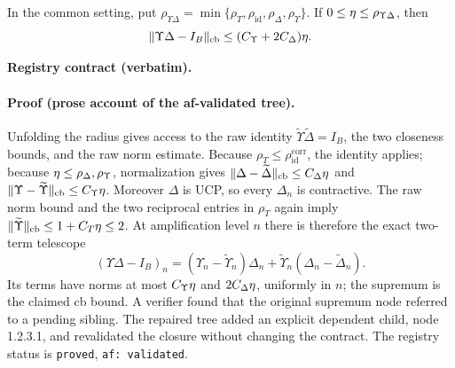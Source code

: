\begin{lemma}\label{lem:routef-upsilon-delta-telescope}
In the common setting, put
$\rho_{\Upsilon\Delta}=\min\{\rho_T,\rho_{\mathrm{id}},\rho_{\Delta},\rho_{\Upsilon}\}$.
If $0\le\eta\le\rho_{\Upsilon\Delta}$, then
\[
 \lVert \Upsilon\Delta-I_B\rVert_{\mathrm{cb}}
 \le(C_{\Upsilon}+2C_{\Delta})\eta .
\]
\end{lemma}
\noindent\textbf{Registry contract (verbatim).} 
\paragraph{Proof (prose account of the af-validated tree).}
Unfolding the radius gives access to the raw identity
$\widetilde\Upsilon\widetilde\Delta=I_B$, the two closeness bounds, and the raw norm
estimate. Because $\rho_T\le\rho_{\mathrm{id}}^{\mathrm{corr}}$, the identity applies;
because $\eta\le\rho_{\Delta},\rho_{\Upsilon}$, normalization gives
$\lVert \Delta-\widetilde\Delta\rVert_{\mathrm{cb}}\le C_{\Delta}\eta$ and
$\lVert \Upsilon-\widetilde\Upsilon\rVert_{\mathrm{cb}}\le C_{\Upsilon}\eta$.
Moreover $\Delta$ is UCP, so every $\Delta_n$ is contractive. The raw norm bound and the
two reciprocal entries in $\rho_T$ again imply
$\lVert \widetilde\Upsilon\rVert_{\mathrm{cb}}\le1+C_T\eta\le2$. At amplification level
$n$ there is therefore the exact two-term telescope
\[
 (\Upsilon\Delta-I_B)_n=(\Upsilon_n-\widetilde\Upsilon_n)\Delta_n
 +\widetilde\Upsilon_n(\Delta_n-\widetilde\Delta_n).
\]
Its terms have norms at most $C_{\Upsilon}\eta$ and $2C_{\Delta}\eta$,
uniformly in $n$; the supremum is the claimed cb bound. A verifier found that the original
supremum node referred to a pending sibling. The repaired tree added an explicit dependent
child, node 1.2.3.1, and revalidated the closure without changing the contract. The registry
status is \texttt{proved}, \texttt{af: validated}.

